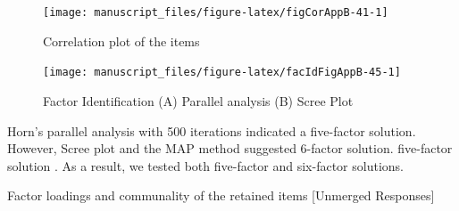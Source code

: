 \documentclass[
  english,
  man]{apa6}
\begin{document}
\begin{appendix}
\begin{figure}

{\centering \texttt{[image: manuscript\_files/figure-latex/figCorAppB-41-1]} 

}

\caption{Correlation plot of the items}\label{fig:figCorAppB-41}
\end{figure}

\begin{figure}

{\centering \texttt{[image: manuscript\_files/figure-latex/facIdFigAppB-45-1]} 

}

\caption{Factor Identification (A) Parallel analysis (B) Scree Plot}\label{fig:facIdFigAppB-45}
\end{figure}

Horn's parallel analysis with 500 iterations indicated a five-factor
solution. However, Scree plot and the MAP method suggested 6-factor
solution. five-factor solution . As a result, we tested both five-factor
and six-factor solutions.

\begin{table}[h]

\begin{center}
\begin{threeparttable}

\caption{\label{tab:EFATableAppB-48}Factor loadings and communality of the retained items [Unmerged Responses]}

\small{

}
\end{threeparttable}
\end{center}
\end{table}
\end{appendix}
\end{document}
